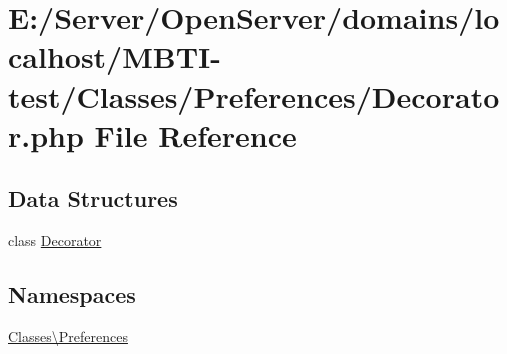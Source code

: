 \hypertarget{_decorator_8php}{}\section{E\+:/\+Server/\+Open\+Server/domains/localhost/\+M\+B\+T\+I-\/test/\+Classes/\+Preferences/\+Decorator.php File Reference}
\label{_decorator_8php}
\subsection*{Data Structures}
\begin{DoxyCompactItemize}
\item 
class \hyperlink{class_classes_1_1_preferences_1_1_decorator}{Decorator}
\end{DoxyCompactItemize}
\subsection*{Namespaces}
\begin{DoxyCompactItemize}
\item 
 \hyperlink{namespace_classes_1_1_preferences}{Classes\textbackslash{}\+Preferences}
\end{DoxyCompactItemize}
